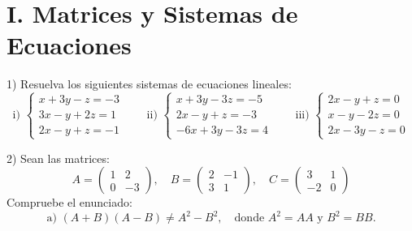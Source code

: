 \documentclass[letterpaper, 12pt]{article}
\newenvironment{ejercicios}{}{}
\begin{document}
\begin{ejercicios}

\section*{I. Matrices y Sistemas de Ecuaciones}

1) Resuelva los siguientes sistemas de ecuaciones lineales:
$$ \text{i) } \begin{cases} x + 3y - z = -3 \\ 3x - y + 2z = 1 \\ 2x - y + z = -1 \end{cases} \qquad \text{ii) } \begin{cases} x + 3y - 3z = -5 \\ 2x - y + z = -3 \\ -6x + 3y - 3z = 4 \end{cases} \qquad \text{iii) } \begin{cases} 2x - y + z = 0 \\ x - y - 2z = 0 \\ 2x - 3y - z = 0 \end{cases} $$

\vspace{0.5cm}

2) Sean las matrices:
$$ A = \begin{pmatrix} 1 & 2 \\ 0 & -3 \end{pmatrix}, \quad B = \begin{pmatrix} 2 & -1 \\ 3 & 1 \end{pmatrix}, \quad C = \begin{pmatrix} 3 & 1 \\ -2 & 0 \end{pmatrix} $$
Compruebe el enunciado:
$$ \text{a) } (A+B)(A-B) \neq A^2 - B^2, \quad \text{donde } A^2 = AA \text{ y } B^2 = BB. $$

\vspace{0.5cm}


\end{ejercicios}
\end{document}
